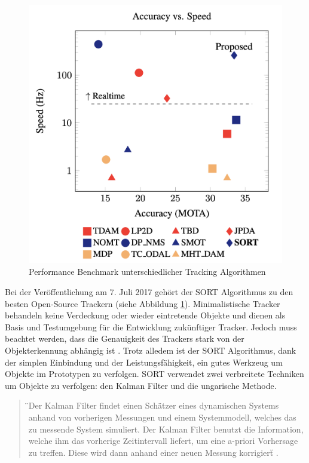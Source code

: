 \begin{figure}[htb]
	\centering
	\includegraphics[width=.9\textwidth]{images/sort}
	\caption[Performance Benchmark unterschiedlicher Tracking Algorithmen]{Performance Benchmark unterschiedlicher Tracking Algorithmen \cite{DBLP:journals/corr/BewleyGORU16}}
	\label{fig:sort}
\end{figure}

Bei der Veröffentlichung am 7. Juli 2017 gehört der \ac{SORT} Algorithmus zu den besten Open-Source Trackern \cite{DBLP:journals/corr/BewleyGORU16} (siehe Abbildung \ref{fig:sort}). Minimalistische Tracker behandeln keine Verdeckung oder wieder eintretende Objekte und dienen als Basis und Testumgebung für die Entwicklung zukünftiger Tracker. Jedoch muss beachtet werden, dass die Genauigkeit des Trackers stark von der Objekterkennung abhängig ist \cite{sort_gh}. Trotz alledem ist der \ac{SORT} Algorithmus, dank der simplen Einbindung und der Leistungsfähigkeit, ein gutes Werkzeug um Objekte im Prototypen zu verfolgen. \ac{SORT} verwendet zwei verbreitete Techniken um Objekte zu verfolgen: den Kalman Filter und die ungarische Methode. 

\begin{quote}
	\"{}Der Kalman Filter findet einen Schätzer eines dynamischen Systems anhand von vorherigen Messungen und einem Systemmodell, welches das zu messende System simuliert. Der Kalman Filter benutzt die Information, welche ihm das vorherige Zeitintervall liefert, um eine a-priori Vorhersage zu treffen. Diese wird dann anhand einer neuen Messung korrigiert\"{} \cite{asida_kalman}.
\end{quote}

